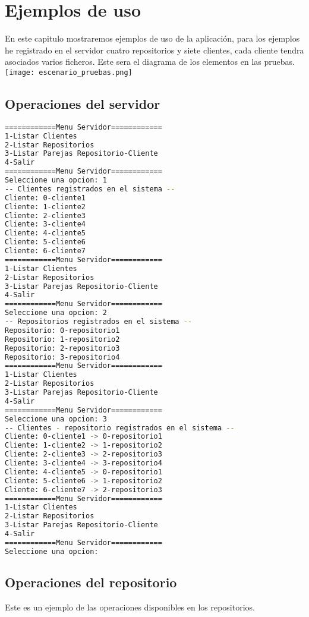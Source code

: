 \chapter{Ejemplos de uso}

En este capitulo mostraremos ejemplos de uso de la aplicación, para los ejemplos he registrado en el servidor cuatro repositorios y siete clientes, cada cliente tendra asociados varios ficheros.
Este sera el diagrama de los elementos en las pruebas.
\texttt{[image: escenario\_pruebas.png]}

\section{Operaciones del servidor}
\begin{lstlisting}[language=bash,frame=single,texcl=true,basicstyle=\small]
============Menu Servidor============
1-Listar Clientes
2-Listar Repositorios
3-Listar Parejas Repositorio-Cliente
4-Salir
============Menu Servidor============
Seleccione una opcion: 1   
-- Clientes registrados en el sistema --
Cliente: 0-cliente1
Cliente: 1-cliente2
Cliente: 2-cliente3
Cliente: 3-cliente4
Cliente: 4-cliente5
Cliente: 5-cliente6
Cliente: 6-cliente7
============Menu Servidor============
1-Listar Clientes
2-Listar Repositorios
3-Listar Parejas Repositorio-Cliente
4-Salir
============Menu Servidor============
Seleccione una opcion: 2
-- Repositorios registrados en el sistema --
Repositorio: 0-repositorio1
Repositorio: 1-repositorio2
Repositorio: 2-repositorio3
Repositorio: 3-repositorio4
============Menu Servidor============
1-Listar Clientes
2-Listar Repositorios
3-Listar Parejas Repositorio-Cliente
4-Salir
============Menu Servidor============
Seleccione una opcion: 3
-- Clientes - repositorio registrados en el sistema --
Cliente: 0-cliente1 -> 0-repositorio1
Cliente: 1-cliente2 -> 1-repositorio2
Cliente: 2-cliente3 -> 2-repositorio3
Cliente: 3-cliente4 -> 3-repositorio4
Cliente: 4-cliente5 -> 0-repositorio1
Cliente: 5-cliente6 -> 1-repositorio2
Cliente: 6-cliente7 -> 2-repositorio3
============Menu Servidor============
1-Listar Clientes
2-Listar Repositorios
3-Listar Parejas Repositorio-Cliente
4-Salir
============Menu Servidor============
Seleccione una opcion: 
\end{lstlisting}


\section{Operaciones del repositorio}
Este es un ejemplo de las operaciones disponibles en los repositorios.
